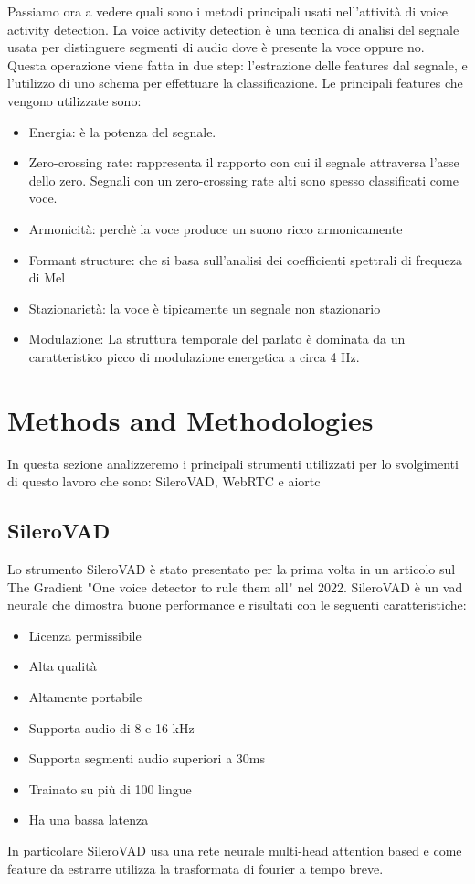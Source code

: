 \documentclass[12pt]{article}
\begin{document}
Passiamo ora a vedere quali sono i metodi principali usati nell'attività di voice activity detection. La voice activity detection è una tecnica di analisi del segnale usata per distinguere segmenti di audio dove è presente la voce oppure no. Questa operazione viene fatta in due step: l'estrazione delle features dal segnale, e l'utilizzo di uno schema per effettuare la classificazione. Le principali features che vengono utilizzate sono:
\begin{itemize}
    \item Energia: è la potenza del segnale.
    \item Zero-crossing rate: rappresenta il rapporto con cui il segnale attraversa l'asse dello zero. Segnali con un zero-crossing rate alti sono spesso classificati come voce.
    \item Armonicità: perchè la voce produce un suono ricco armonicamente
    \item Formant structure: che si basa sull'analisi dei coefficienti spettrali di frequeza di Mel 
    \item Stazionarietà: la voce è tipicamente un segnale non stazionario
    \item Modulazione: La struttura temporale del parlato è dominata da un caratteristico picco di modulazione energetica a circa 4 Hz.
\end{itemize}

\section{Methods and Methodologies}

In questa sezione analizzeremo i principali strumenti utilizzati per lo svolgimenti di questo lavoro che sono: SileroVAD, WebRTC e aiortc

\subsection{SileroVAD}

Lo strumento SileroVAD è stato presentato per la prima volta in un articolo sul The Gradient "One voice detector to rule them all" nel 2022. SileroVAD è un vad neurale che dimostra buone performance e risultati con le seguenti caratteristiche: 
\begin{itemize}
    \item Licenza permissibile
    \item Alta qualità
    \item Altamente portabile
    \item Supporta audio di 8 e 16 kHz
    \item Supporta segmenti audio superiori a 30ms
    \item Trainato su più di 100 lingue
    \item Ha una bassa latenza 
\end{itemize} 
In particolare SileroVAD usa una rete neurale multi-head attention based e come feature da estrarre utilizza la trasformata di fourier a tempo breve.
\end{document}
